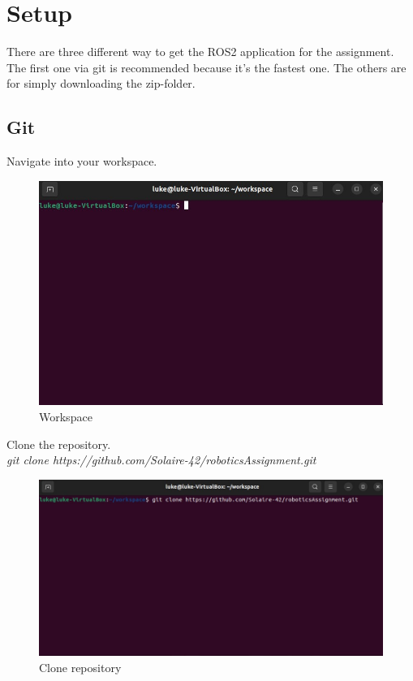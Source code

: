 \section{Setup} \label{sec:setup}
There are three different way to get the ROS2 application for the assignment. The first one via git is recommended because it's the fastest one. The others are for simply downloading the zip-folder. 

\subsection{Git}
Navigate into your workspace.
\begin{figure}[H]
    \centering
    \includegraphics[width=0.8\linewidth]{document//Figure/01workspace.jpg}
    \caption{Workspace}
\end{figure}

Clone the repository. \\ 
\textit{git clone https://github.com/Solaire-42/roboticsAssignment.git}
\begin{figure}[H]
    \centering
    \includegraphics[width=0.8\linewidth]{document//Figure/02clone.jpg}
    \caption{Clone repository}
\end{figure}

\newpage

